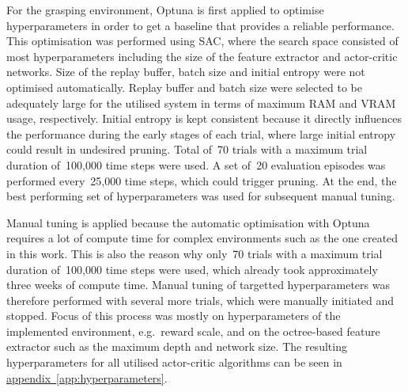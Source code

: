 For the grasping environment, Optuna is first applied to optimise hyperparameters in order to get a baseline that provides a reliable performance. This optimisation was performed using SAC, where the search space consisted of most hyperparameters including the size of the feature extractor and actor-critic networks. Size of the replay buffer, batch size and initial entropy were not optimised automatically. Replay buffer and batch size were selected to be adequately large for the utilised system in terms of maximum RAM and VRAM usage, respectively. Initial entropy is kept consistent because it directly influences the performance during the early stages of each trial, where large initial entropy could result in undesired pruning. Total of~70 trials with a maximum trial duration of~100,000 time steps were used. A set of~20 evaluation episodes was performed every~25,000 time steps, which could trigger pruning. At the end, the best performing set of hyperparameters was used for subsequent manual tuning.

Manual tuning is applied because the automatic optimisation with Optuna requires a lot of compute time for complex environments such as the one created in this work. This is also the reason why only~70 trials with a maximum trial duration of~100,000 time steps were used, which already took approximately three weeks of compute time. Manual tuning of targetted hyperparameters was therefore performed with several more trials, which were manually initiated and stopped. Focus of this process was mostly on hyperparameters of the implemented environment, e.g.~reward scale, and on the octree-based feature extractor such as the maximum depth and network size. The resulting hyperparameters for all utilised actor-critic algorithms can be seen in \hyperref[app:hyperparameters]{appendix~\ref*{app:hyperparameters}}.
